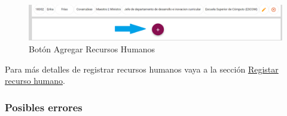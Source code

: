            \begin{figure}[H]
                \centering
                \hypertarget{add}{\includegraphics[width=0.7\linewidth]{images/SP1/BtnAgregar}}
                \caption{Botón Agregar Recursos Humanos}
                \label{add}
            \end{figure}

            Para más detalles de registrar recursos humanos vaya a la sección \hyperlink{registrarRH}{Registar recurso humano}.

        \subsubsection{Posibles errores}

